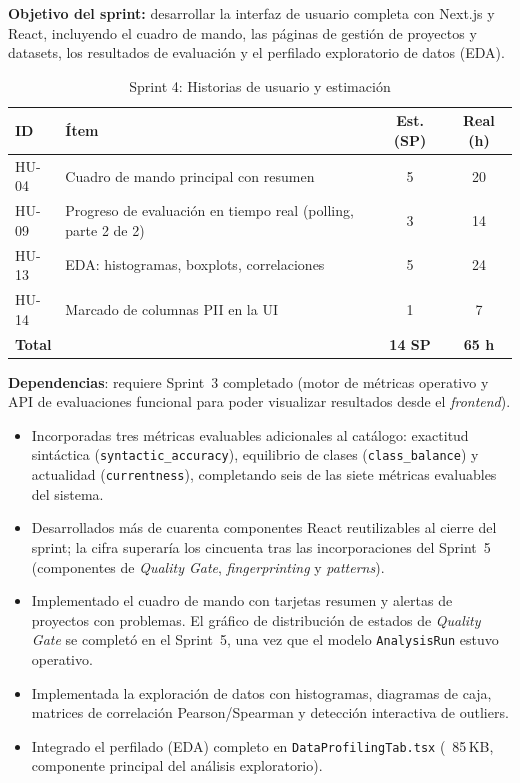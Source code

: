 \textbf{Objetivo del sprint:} desarrollar la interfaz de usuario completa con
Next.js y React, incluyendo el cuadro de mando, las páginas de gestión de
proyectos y datasets, los resultados de evaluación y el perfilado exploratorio
de datos (\ac{EDA}).

\begin{table}[htbp]
  \centering
  \small
  \caption{Sprint 4: Historias de usuario y estimación}
  \label{tab:sprint4-hu}
  \begin{tabularx}{\textwidth}{l X c c}
    \toprule
    \textbf{ID} & \textbf{Ítem} & \textbf{Est. (SP)} & \textbf{Real (h)} \\
    \midrule
    HU-04 & Cuadro de mando principal con resumen & 5 & 20 \\
    HU-09 & Progreso de evaluación en tiempo real (polling, parte 2 de 2) & 3 & 14 \\
    HU-13 & \ac{EDA}: histogramas, boxplots, correlaciones & 5 & 24 \\
    HU-14 & Marcado de columnas \ac{PII} en la \ac{UI} & 1 & 7 \\
    \midrule
    \multicolumn{2}{l}{\textbf{Total}} & \textbf{14 SP} & \textbf{65 h} \\
    \bottomrule
  \end{tabularx}
\end{table}

\textbf{Dependencias}: requiere Sprint~3 completado (motor de métricas
operativo y \ac{API} de evaluaciones funcional para poder visualizar
resultados desde el \emph{frontend}).

\begin{itemize}
  \item Incorporadas tres métricas evaluables adicionales al catálogo:
    exactitud sintáctica (\texttt{syntactic\_accuracy}), equilibrio de clases
    (\texttt{class\_balance}) y actualidad (\texttt{currentness}), completando
    seis de las siete métricas evaluables del sistema.
  \item Desarrollados más de cuarenta componentes React reutilizables
    al cierre del sprint; la cifra superaría los cincuenta tras las
    incorporaciones del Sprint~5 (componentes de \emph{Quality Gate},
    \emph{fingerprinting} y \emph{patterns}).
  \item Implementado el cuadro de mando con tarjetas resumen y alertas de
    proyectos con problemas.  El gráfico de distribución de estados de
    \emph{Quality Gate} se completó en el Sprint~5, una vez que el modelo
    \texttt{AnalysisRun} estuvo operativo.
  \item Implementada la exploración de datos con histogramas, diagramas de
    caja, matrices de correlación Pearson/Spearman y detección interactiva de
    outliers.
  \item Integrado el perfilado (\ac{EDA}) completo en \texttt{DataProfilingTab.tsx}
    (~85\,KB, componente principal del análisis exploratorio).
\end{itemize}

